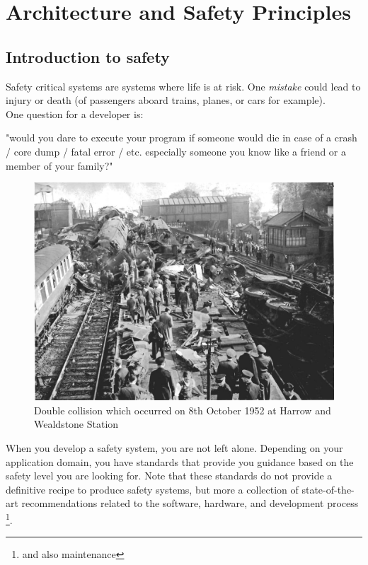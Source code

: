 \chapter{Architecture and Safety Principles}

\section{Introduction to safety}
Safety critical systems are systems where life is at risk. One \textit{mistake} could lead to injury or death (of passengers aboard trains, planes, or cars for example).\\

\noindent One question for a developer is: 
\begin{center}
"would you dare to execute your program if someone would die in case of a crash / core dump / fatal error / etc. especially someone you know like a friend or a member of your family?"    
\end{center}

\begin{figure}[h]
\centering\includegraphics[scale=0.2]{Pictures/chapterSafetyPrinciples/SAFETY-crash.jpg}
\caption{Double collision which occurred on 8th October 1952 at Harrow and Wealdstone Station}
\end{figure}

When you develop a safety system, you are not left alone. Depending on your application domain, you have standards that provide you guidance based on the safety level you are looking for. Note that these standards do not provide a definitive recipe to produce safety systems, but more a collection of state-of-the-art recommendations related to the software, hardware, and development process \footnote{and also maintenance}.

